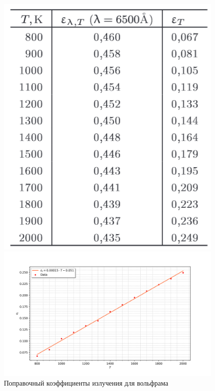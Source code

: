 \documentclass[a4paper]{article}
\begin{document}
\begin{figure}[h]
	\begin{center}
	\begin{minipage}[h]{0.3\linewidth}
	\includegraphics[width=1\linewidth]{p2.png}
	\caption{Поправочный коэффициенты излучения для вольфрама} 
	\label{p2}
	\end{minipage}
    \hfill
    \begin{minipage}[h]{0.6\linewidth}
        \includegraphics[width=1\linewidth]{E_t.png}

\end{minipage}
\end{center}
\end{figure}
\end{document}
